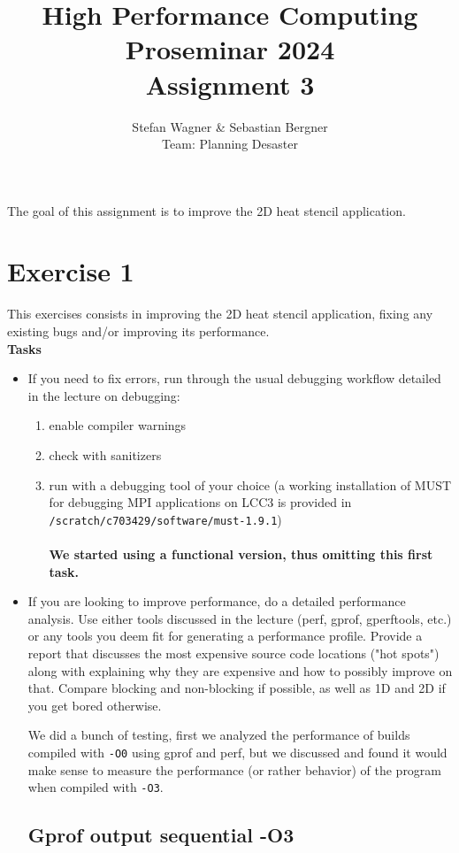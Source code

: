 \documentclass[UTF-8]{article}
\title{High Performance Computing Proseminar 2024 \\
    \large Assignment 3} %
\author{Stefan Wagner \& Sebastian Bergner\\Team: Planning Desaster}
\begin{document}
    
    \maketitle
    
    The goal of this assignment is to improve the 2D heat stencil application.
    
    \section*{Exercise 1}
    This exercises consists in improving the 2D heat stencil application, fixing any existing bugs and/or improving its performance.
    \\
    \textbf{Tasks}
    \begin{itemize}
    	\item If you need to fix errors, run through the usual debugging workflow detailed in the lecture on debugging:
    	\begin{enumerate}[label=\roman*]
    		\item enable compiler warnings
    		\item check with sanitizers
    		\item run with a debugging tool of your choice (a working installation of MUST for debugging MPI applications on LCC3 is provided in \verb|/scratch/c703429/software/must-1.9.1|)
    		\\
    		\\
    		\textbf{We started using a functional version, thus omitting this first task.}
    	\end{enumerate}
    	\item If you are looking to improve performance, do a detailed performance analysis. Use either tools discussed in the lecture (perf, gprof, gperftools, etc.) or any tools you deem fit for generating a performance profile. Provide a report that discusses the most expensive source code locations ("hot spots") along with explaining why they are expensive and how to possibly improve on that. Compare blocking and non-blocking if possible, as well as 1D and 2D if you get bored otherwise.
    	
    	
    	We did a bunch of testing, first we analyzed the performance of builds compiled with \verb|-O0| using gprof and perf, but we discussed and found it would make sense to measure the performance (or rather behavior) of the program when compiled with \verb|-O3|.
    	
\subsection*{Gprof output sequential -O3}


\end{itemize}
\end{document}
